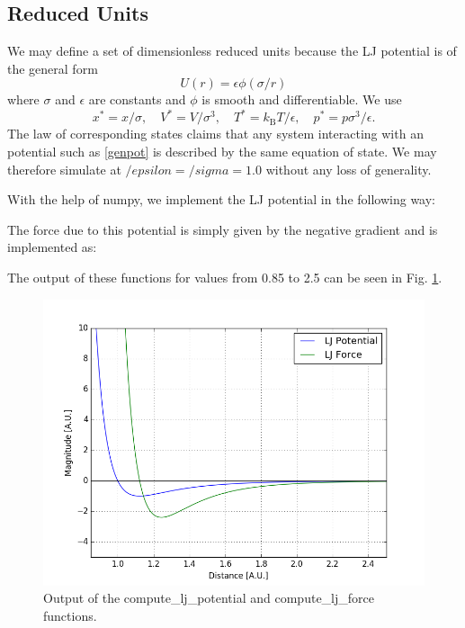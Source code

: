 \documentclass[11pt,a4paper]{scrartcl}
\makeatletter
\newcommand{\listfile}[6]{
}
\makeatother
\begin{document}
\subsection{Reduced Units}
We may define a set of dimensionless reduced units because the LJ potential is of the general form
\begin{equation}\label{genpot}
U(r) = \epsilon \phi(\sigma/r)
\end{equation}
where $\sigma$ and $\epsilon$ are constants and $\phi$ is smooth and differentiable. We use
\begin{equation}
x^* = x/\sigma,\quad V^* = V/\sigma^3, \quad T^* = k_\mathrm{B} T/\epsilon,\quad p^* = p\sigma^3/\epsilon.
\end{equation}
The law of corresponding states claims that any system interacting with an potential such as \ref{genpot} is described by the same equation of state. We may therefore simulate at $/epsilon = /sigma = 1.0$ without any loss of generality.

With the help of numpy, we implement the LJ potential in the following way:
\listfile{../src/ljlib.py}{/src/ljlib.py}{10}{13}{LJ Potential}{ljpotential}
The force due to this potential is simply given by the negative gradient and is implemented as:
\listfile{../src/ljlib.py}{/src/ljlib.py}{15}{19}{LJ Force}{ljforce}
The output of these functions for values from 0.85 to 2.5 can be seen in Fig. \ref{fig:lj}.
\begin{figure}[h]
\includegraphics[width=0.7\linewidth]{../fig/ljplot.png}
  \centering
  \caption{Output of the compute\_lj\_potential and compute\_lj\_force functions.}
\label{fig:lj}
\end{figure}
\end{document}
